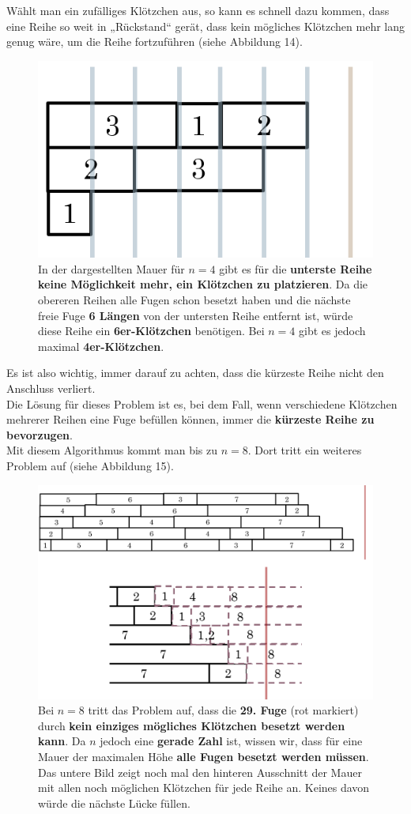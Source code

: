 \documentclass[a4paper,12pt]{article}
\begin{document}
Wählt man ein zufälliges Klötzchen aus, so kann es schnell dazu kommen, dass eine Reihe so weit in „Rückstand“ gerät, dass kein mögliches Klötzchen mehr lang genug wäre, um die Reihe fortzuführen (siehe Abbildung 14).
\begin{figure}[H]
    \centering
    \includegraphics[width=0.5\linewidth]{Bilder/Aufgabe1/Problem_Mauerbauart_02_RowSum.png}
    \caption{In der dargestellten Mauer für $n = 4$ gibt es für die \textbf{unterste Reihe keine Möglichkeit mehr, ein Klötzchen zu platzieren}. Da die obereren Reihen alle Fugen schon besetzt haben und die nächste freie Fuge \textbf{6 Längen} von der untersten Reihe entfernt ist, würde diese Reihe ein \textbf{6er-Klötzchen} benötigen. Bei $n = 4$ gibt es jedoch maximal \textbf{4er-Klötzchen}.}
\end{figure}
Es ist also wichtig, immer darauf zu achten, dass die kürzeste Reihe nicht den Anschluss verliert.
\\[0.4cm]
Die Lösung für dieses Problem ist es, bei dem Fall, wenn verschiedene Klötzchen mehrerer Reihen eine Fuge befüllen können, immer die \textbf{kürzeste Reihe zu bevorzugen}.
\\[0.4cm]
Mit diesem Algorithmus kommt man bis zu $n = 8$. Dort tritt ein weiteres Problem auf (siehe Abbildung 15).
\begin{figure}[H]
    \centering
    \includegraphics[width=1\linewidth]{Bilder/Aufgabe1/Problem_Mauerbauart_02_Kein_Klotz.png}
    \caption{Bei $n = 8$ tritt das Problem auf, dass die \textbf{29. Fuge} (rot markiert) durch \textbf{kein einziges mögliches Klötzchen besetzt werden kann}. Da $n$ jedoch eine \textbf{gerade Zahl} ist, wissen wir, dass für eine Mauer der maximalen Höhe \textbf{alle Fugen besetzt werden müssen}. Das untere Bild zeigt noch mal den hinteren Ausschnitt der Mauer mit allen noch möglichen Klötzchen für jede Reihe an. Keines davon würde die nächste Lücke füllen.}
\end{figure}
\end{document}
